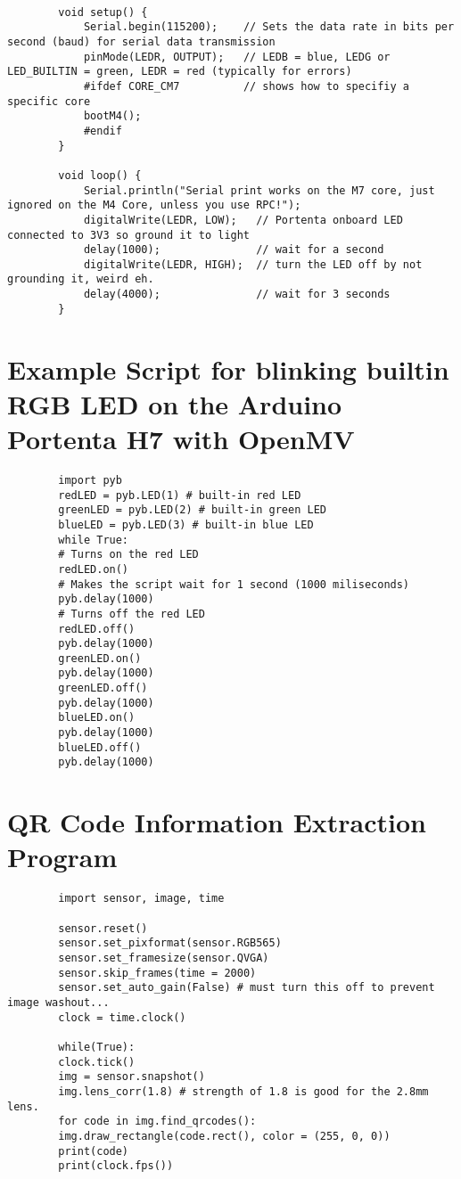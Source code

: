 	\begin{verbatim}
		
		void setup() {
			Serial.begin(115200);    // Sets the data rate in bits per second (baud) for serial data transmission
			pinMode(LEDR, OUTPUT);   // LEDB = blue, LEDG or LED_BUILTIN = green, LEDR = red (typically for errors)
			#ifdef CORE_CM7          // shows how to specifiy a specific core 
			bootM4();
			#endif
		}
		
		void loop() {
			Serial.println("Serial print works on the M7 core, just ignored on the M4 Core, unless you use RPC!");
			digitalWrite(LEDR, LOW);   // Portenta onboard LED connected to 3V3 so ground it to light
			delay(1000);               // wait for a second
			digitalWrite(LEDR, HIGH);  // turn the LED off by not grounding it, weird eh.
			delay(4000);               // wait for 3 seconds
		}
	\end{verbatim}

	\section{Example Script for blinking builtin RGB LED on the Arduino Portenta H7 with OpenMV}

	\begin{verbatim}
		import pyb
		redLED = pyb.LED(1) # built-in red LED
		greenLED = pyb.LED(2) # built-in green LED
		blueLED = pyb.LED(3) # built-in blue LED
		while True:
		# Turns on the red LED
		redLED.on()
		# Makes the script wait for 1 second (1000 miliseconds)
		pyb.delay(1000)
		# Turns off the red LED
		redLED.off()
		pyb.delay(1000)
		greenLED.on()
		pyb.delay(1000)
		greenLED.off()
		pyb.delay(1000)
		blueLED.on()
		pyb.delay(1000)
		blueLED.off()
		pyb.delay(1000)
	\end{verbatim}


	\section{QR Code Information Extraction Program}

	\begin{verbatim}
		import sensor, image, time
		
		sensor.reset()
		sensor.set_pixformat(sensor.RGB565)
		sensor.set_framesize(sensor.QVGA)
		sensor.skip_frames(time = 2000)
		sensor.set_auto_gain(False) # must turn this off to prevent image washout...
		clock = time.clock()
		
		while(True):
		clock.tick()
		img = sensor.snapshot()
		img.lens_corr(1.8) # strength of 1.8 is good for the 2.8mm lens.
		for code in img.find_qrcodes():
		img.draw_rectangle(code.rect(), color = (255, 0, 0))
		print(code)
		print(clock.fps())
		
	\end{verbatim}

